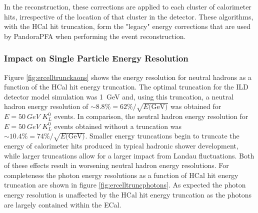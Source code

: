 In the reconstruction, these corrections are applied to each cluster of calorimeter hits, irrespective of the location of that cluster in the detector.  These algorithms, with the HCal hit truncation, form the "legacy" energy corrections that are used by PandoraPFA when performing the event reconstruction.    


\subsubsection{Impact on Single Particle Energy Resolution}
Figure \ref{fig:ercelltrunckaons} shows the energy resolution for neutral hadrons as a function of the HCal hit energy truncation.  The optimal truncation for the ILD detector model simulation was 1~GeV and, using this truncation, a neutral hadron energy resolution of $\sim 8.8\% = 62\% / \sqrt{E\text{(GeV)}}$ was obtained for $E = 50~GeV$ $K^{0}_{L}$ events.  In comparison, the neutral hadron energy resolution for $E = 50~GeV$ $K^{0}_{L}$ events obtained without a truncation was $\sim 10.4\% = 74\% / \sqrt{E\text{(GeV)}}$.  Smaller energy truncations begin to truncate the energy of calorimeter hits produced in typical hadronic shower development, while larger truncations allow for a larger impact from Landau fluctuations.  Both of these effects result in worsening neutral hadron energy resolutions.  For completeness the photon energy resolutions as a function of HCal hit energy truncation are shown in figure \ref{fig:ercelltruncphotons}.  As expected the photon energy resolution is unaffected by the HCal hit energy truncation as the photons are largely contained within the ECal.

